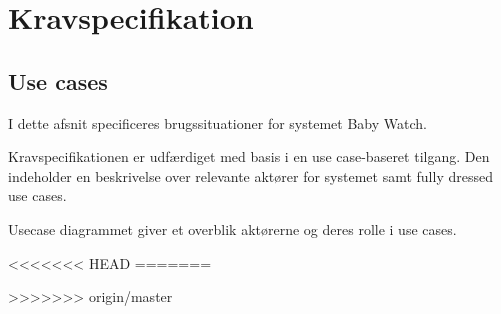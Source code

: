 \chapter{Kravspecifikation}


\newpage
\section{Use cases}

I dette afsnit specificeres brugssituationer for systemet Baby Watch.

Kravspecifikationen er udfærdiget med basis i en use case-baseret tilgang. Den indeholder en beskrivelse over relevante aktører for systemet samt fully dressed use cases.


Usecase diagrammet giver et overblik aktørerne og deres rolle i use cases.


\newpage

\newpage

\newpage

\newpage

<<<<<<< HEAD
\newpage
=======

>>>>>>> origin/master


